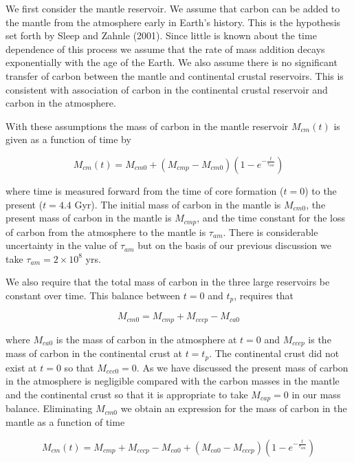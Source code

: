 
We first consider the mantle reservoir. We assume that carbon can be added to the mantle from the atmosphere early in Earth's history. This is the hypothesis set forth by Sleep and Zahnle (2001). Since little is known about the time dependence of this process we assume that the rate of mass addition decays exponentially with the age of the Earth. We also assume there is no significant transfer of carbon between the mantle and continental crustal reservoirs. This is consistent with association of carbon in the continental crustal reservoir and carbon in the atmosphere.

With these assumptions the mass of carbon in the mantle reservoir $M_{cm}(t)$ is given as a function of time by

\begin{equation}
  M_{cm}(t) = M_{cm0} + (M_{cmp} - M_{cm0}) (1 - e^{-\frac{t}{\tau_{am}}})
\end{equation}

where time is measured forward from the time of core formation ($t=0$) to the present ($t=4.4$ Gyr). The initial mass of carbon in the mantle is $M_{cm0}$, the present mass of carbon in the mantle is $M_{cmp}$, and the time constant for the loss of carbon from the atmosphere to the mantle is $\tau_{am}$. There is considerable uncertainty in the value of $\tau_{am}$ but on the basis of our previous discussion we take $\tau_{am} = 2 \times 10^8$ yrs.

We also require that the total mass of carbon in the three large reservoirs be constant over time. This balance between $t=0$ and $t_p$, requires that

\begin{equation}
  M_{cm0} = M_{cmp} + M_{cccp} - M_{ca0}
\end{equation}

where $M_{ca0}$ is the mass of carbon in the atmosphere at $t=0$ and $M_{cccp}$ is the mass of carbon in the continental crust at $t=t_p$. The continental crust did not exist at $t=0$ so that $M_{ccc0}=0$. As we have discussed the present mass of carbon in the atmosphere is negligible compared with the carbon masses in the mantle and the continental crust so that it is appropriate to take $M_{cap}=0$ in our mass balance. Eliminating $M_{cm0}$ we obtain an expression for the mass of carbon in the mantle as a function of time

\begin{equation}
  M_{cm}(t) = M_{cmp} + M_{cccp} - M_{ca0} + (M_{ca0} - M_{cccp}) (1 - e^{-\frac{t}{\tau_{am}}})
\end{equation}


